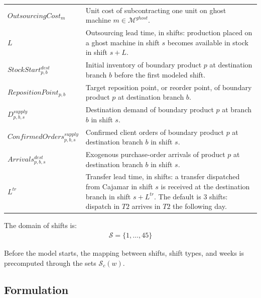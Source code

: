 \documentclass{article}
\begin{document}
\begin{longtable}{@{}L{0.35\textwidth}L{0.59\textwidth}@{}}
$OutsourcingCost_m$ & Unit cost of subcontracting one unit on ghost machine $m \in \mathcal{M}^{ghost}$. \\

$L$ & Outsourcing lead time, in shifts: production placed on a ghost machine in shift $s$ becomes available in stock in shift $s+L$. \\

$StockStart^{dest}_{p,b}$ & Initial inventory of boundary product $p$ at destination branch $b$ before the first modeled shift. \\

$RepositionPoint_{p,b}$ & Target reposition point, or reorder point, of boundary product $p$ at destination branch $b$. \\

$D^{supply}_{p,b,s}$ & Destination demand of boundary product $p$ at branch $b$ in shift $s$. \\

$ConfirmedOrders^{supply}_{p,b,s}$ & Confirmed client orders of boundary product $p$ at destination branch $b$ in shift $s$. \\

$Arrivals^{dest}_{p,b,s}$ & Exogenous purchase-order arrivals of product $p$ at destination branch $b$ in shift $s$. \\

$L^{tr}$ & Transfer lead time, in shifts: a transfer dispatched from Cajamar in shift $s$ is received at the destination branch in shift $s + L^{tr}$. The default is 3 shifts: dispatch in $T2$ arrives in $T2$ the following day. \\

\end{longtable}
\endgroup

The domain of shifts is:
\begin{align}
\mathcal{S} = \{1,\dots,45\}
\end{align}

Before the model starts, the mapping between shifts, shift types, and weeks is precomputed through the sets $\mathcal{S}_c(w)$.

\FloatBarrier

\subsection{Formulation}

\end{document}
